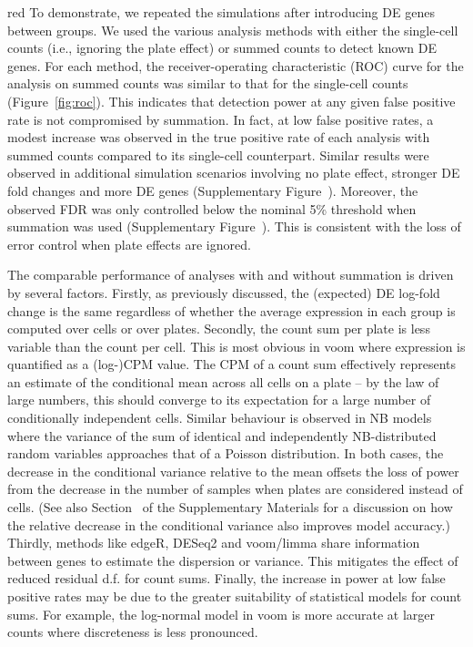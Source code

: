 \documentclass[oupdraft]{bio}
\begin{document}
\begin{color}{red}
To demonstrate, we repeated the simulations after introducing DE genes between groups.
We used the various analysis methods with either the single-cell counts (i.e., ignoring the plate effect) or summed counts to detect known DE genes.
For each method, the receiver-operating characteristic (ROC) curve for the analysis on summed counts was similar to that for the single-cell counts (Figure~\ref{fig:roc}).
This indicates that detection power at any given false positive rate is not compromised by summation.
In fact, at low false positive rates, a modest increase was observed in the true positive rate of each analysis with summed counts compared to its single-cell counterpart.
Similar results were observed in additional simulation scenarios involving no plate effect, stronger DE fold changes and more DE genes (Supplementary Figure~\supppowerroc{}).
Moreover, the observed FDR was only controlled below the nominal 5\% threshold when summation was used (Supplementary Figure~\supppowerfdr{}).
This is consistent with the loss of error control when plate effects are ignored.

The comparable performance of analyses with and without summation is driven by several factors. 
Firstly, as previously discussed, the (expected) DE log-fold change is the same regardless of whether the average expression in each group is computed over cells or over plates. 
Secondly, the count sum per plate is less variable than the count per cell.
This is most obvious in voom where expression is quantified as a (log-)CPM value.
The CPM of a count sum effectively represents an estimate of the conditional mean across all cells on a plate -- by the law of large numbers, this should converge to its expectation for a large number of conditionally independent cells.
Similar behaviour is observed in NB models where the variance of the sum of identical and independently NB-distributed random variables approaches that of a Poisson distribution.
In both cases, the decrease in the conditional variance relative to the mean offsets the loss of power from the decrease in the number of samples when plates are considered instead of cells.
(See also Section~\suppmeanvar{} of the Supplementary Materials for a discussion on how the relative decrease in the conditional variance also improves model accuracy.)
Thirdly, methods like edgeR, DESeq2 and voom/limma share information between genes to estimate the dispersion or variance. 
This mitigates the effect of reduced residual d.f. for count sums.
Finally, the increase in power at low false positive rates may be due to the greater suitability of statistical models for count sums.
For example, the log-normal model in voom is more accurate at larger counts where discreteness is less pronounced.
\end{color}
\end{document}
